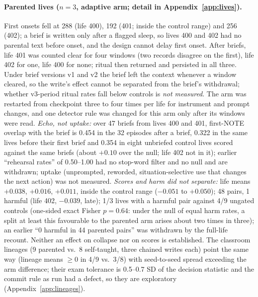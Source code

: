 \documentclass{article}
\newcommand{\nm}{\emph{not measured}}
\begin{document}
\paragraph{Parented lives ($n = 3$, adaptive arm; detail in Appendix~\ref{app:lives}).} First onsets fell at 288 (life 400), 192 (401; inside the control range) and 256 (402); a brief is written only after a flagged sleep, so lives 400 and 402 had no parental text before onset, and the design cannot delay first onset. After briefs, life 401 was counted clear for four windows (two records disagree on the first), life 402 for one, life 400 for none; ritual then returned and persisted in all three. Under brief versions v1 and v2 the brief left the context whenever a window cleared, so the write's effect cannot be separated from the brief's withdrawal; whether v3-period ritual rates fall below controls is \nm. The arm was restarted from checkpoint three to four times per life for instrument and prompt changes, and one detector rule was changed for this arm only after its windows were read. \emph{Echo, not uptake:} over 47 briefs from lives 400 and 401, first-NOTE overlap with the brief is 0.454 in the 32 episodes after a brief, 0.322 in the same lives before their first brief and 0.354 in eight unbriefed control lives scored against the same briefs (about $+0.10$ over the null; life 402 not in it); earlier ``rehearsal rates'' of 0.50--1.00 had no stop-word filter and no null and are withdrawn; uptake (unprompted, reworded, situation-selective use that changes the next action) was not measured. \emph{Scores and harm did not separate:} life means $+0.038$, $+0.016$, $+0.011$, inside the control range ($-0.051$ to $+0.050$); 48 pairs, 1 harmful (life 402, $-0.039$, late); 1/3 lives with a harmful pair against 4/9 ungated controls (one-sided exact Fisher $p = 0.64$: under the null of equal harm rates, a split at least this favourable to the parented arm arises about two times in three); an earlier ``0 harmful in 44 parented pairs'' was withdrawn by the full-life recount. Neither an effect on collapse nor on scores is established. The classroom lineages (9 parented vs.\ 8 self-taught, three chained writes each) point the same way (lineage means $\ge 0$ in 4/9 vs.\ 3/8) with seed-to-seed spread exceeding the arm difference; their exam tolerance is 0.5--0.7 SD of the decision statistic and the commit rule as run had a defect, so they are exploratory (Appendix~\ref{app:lineages}).

\end{document}
